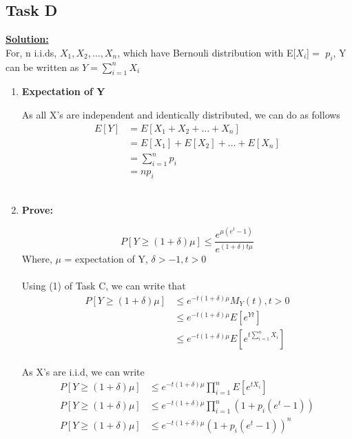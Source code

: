 \documentclass[12pt]{article}
\begin{document}
\subsection{Task D}
\textbf{\underline{Solution:}} \\
For, n i.i.ds, $X_1, X_2, \dots, X_n$, which have Bernouli distribution with E[$X_i$]$=$ $p_i$, Y can be written as $Y=\sum_{i=1}^nX_i$\\
\begin{enumerate}
    \item \textbf{Expectation of Y}

As all X's are independent and identically distributed, we can do as follows
\begin{equation}
\begin{split}
    E[Y]& = E[X_1+ X_2+ \dots+ X_n] \\
    & = E[X_1]+E[X_2]+\dots+E[X_n] \\
    & = \sum_{i=1}^np_i \\
    & = np_i
\end{split}
\end{equation}
\\
    \item \textbf{Prove:}

\begin{equation}
    P[Y \geq (1+\delta)\mu] \leq \frac{e^{\mu(e^t-1)}}{e^{(1+\delta)t\mu}}
\end{equation}
Where, $\mu$ = expectation of Y, $\delta>-1, t>0$ \\
\\
Using (1) of Task C, we can write that
\begin{equation}
\begin{split}
    P[Y \geq (1+\delta)\mu]& \leq e^{-t(1+\delta)\mu}M_Y(t), t>0 \\
    & \leq e^{-t(1+\delta)\mu}E[e^{Yt}] \\
    & \leq e^{-t(1+\delta)\mu}E[e^{t\sum_{i=1}^nX_i}]\\
\end{split}
\end{equation}

As X's are i.i.d, we can write
\begin{equation}
\begin{split}
     P[Y \geq (1+\delta)\mu]& \leq e^{-t(1+\delta)\mu}\prod_{i=1}^nE[e^{tX_i}] \\
     P[Y \geq (1+\delta)\mu]& \leq e^{-t(1+\delta)\mu}\prod_{i=1}^n(1+p_i(e^t-1)) \\
     P[Y \geq (1+\delta)\mu]& \leq e^{-t(1+\delta)\mu}(1+p_i(e^t-1))^n \\
\end{split}
\end{equation}


\end{enumerate}
\end{document}
